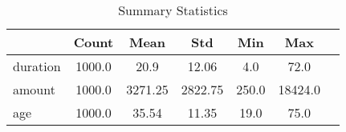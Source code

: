 \begin{table}[ht]
\centering
\caption{Summary Statistics}
\label{tab:summary_stats}
\begin{tabular}{lcccccc}
\toprule
 & \textbf{Count} & \textbf{Mean} & \textbf{Std} & \textbf{Min} & \textbf{Max} \\
\midrule
duration & 1000.0 & 20.9 & 12.06 & 4.0 & 72.0 \\
amount & 1000.0 & 3271.25 & 2822.75 & 250.0 & 18424.0 \\
age & 1000.0 & 35.54 & 11.35 & 19.0 & 75.0 \\
\bottomrule
\end{tabular}
\end{table}

